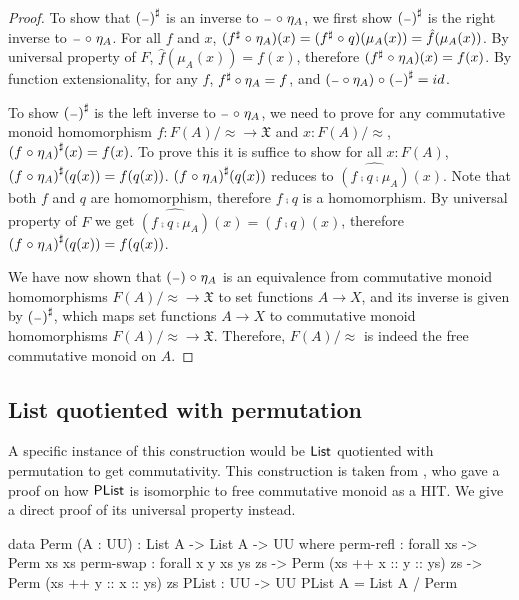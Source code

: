 \begin{proof}
    To show that ${({\scriptstyle{-}})}^{\sharp}$ is an inverse to ${\scriptstyle{-}} \mathrel{\circ} \eta_A$,
    we first show ${({\scriptstyle{-}})}^{\sharp}$ is the right inverse to ${\scriptstyle{-}} \mathrel{\circ} \eta_A$.
    For all $f$ and $x$, $({f}^{\sharp} \mathrel{\circ} \eta_A)(x) = ({f}^{\sharp} \mathrel{\circ} q)(\mu_A(x)) = \hat{f}(\mu_A(x))$.
    By universal property of $F$, $\hat{f}(\mu_A(x)) = f(x)$, therefore $({f}^{\sharp} \mathrel{\circ} \eta_A)(x) = f(x)$.
    By function extensionality, for any $f$, ${f}^{\sharp} \circ \eta_A = f$,
    and $({\scriptstyle{-}} \circ \eta_A) \mathrel{\circ} {({\scriptstyle{-}})}^{\sharp} = id$.

    To show ${({\scriptstyle{-}})}^{\sharp}$ is the left inverse to ${\scriptstyle{-}} \mathrel{\circ} \eta_A$, we need to prove
    for any commutative monoid homomorphism $f : F(A) / \approx \to \mathfrak{X}$ and $x : F(A) / \approx$,
    ${(f \mathrel{\circ} \eta_A)}^{\sharp}(x) = f(x)$. To prove this it is suffice to show for all $x : F(A)$,
    ${(f \mathrel{\circ} \eta_A)}^{\sharp}(q(x)) = f(q(x))$. 
    ${(f \mathrel{\circ} \eta_A)}^{\sharp}(q(x))$ reduces to $\widehat{(f \comp q \comp \mu_A)}(x)$.
    Note that both $f$ and $q$ are homomorphism, therefore $f \comp q$ is a homomorphism. By
    universal property of $F$ we get $\widehat{(f \comp q \comp \mu_A)}(x) = (f \comp q)(x)$,
    therefore ${(f \mathrel{\circ} \eta_A)}^{\sharp}(q(x)) = f(q(x))$.

    We have now shown that $({\scriptstyle{-}}) \mathrel{\circ} \eta_A$ is an equivalence from
    commutative monoid homomorphisms $F(A) / \approx \to \mathfrak{X}$
    to set functions $A \to X$, and its inverse is given by ${({\scriptstyle{-}})}^{\sharp}$, which maps set
    functions $A \to X$ to commutative monoid homomorphisms $F(A) / \approx \to \mathfrak{X}$.
    Therefore, $F(A) / \approx$ is indeed the free commutative monoid on $A$.
\end{proof}


\subsection{List quotiented with permutation}\label{cmon:plist}
A specific instance of this construction would be $\operatorname{\mathsf{List}}$ quotiented with permutation to get commutativity.
This construction is taken from \cite{joramConstructiveFinalSemantics2023}, who gave a proof on how
$\operatorname{\mathsf{PList}}$ is isomorphic to free commutative monoid as a HIT. We give a direct proof of its universal
property instead.

\begin{code}
data Perm (A : UU) : List A -> List A -> UU where
  perm-refl : forall {xs} -> Perm xs xs
  perm-swap : forall {x y xs ys zs} -> Perm (xs ++ x :: y :: ys) zs
                               -> Perm (xs ++ y :: x :: ys) zs 
PList : UU -> UU
PList A = List A / Perm
\end{code}
\vspace{1em}

